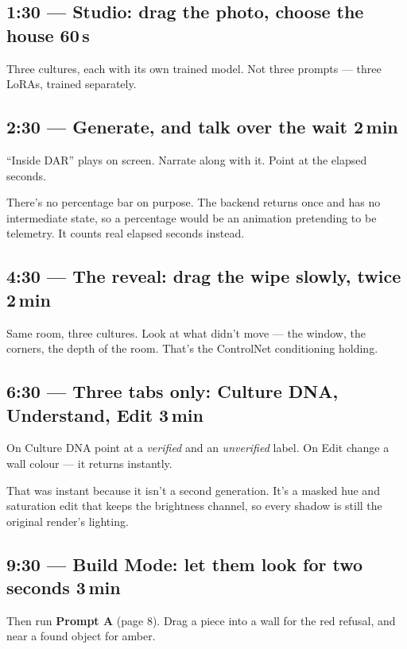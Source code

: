 \documentclass[10.5pt,a4paper]{article}
\begin{document}
\subsection*{1:30 --- Studio: drag the photo, choose the house \hfill \textnormal{\small 60\,s}}
\begin{sayit}
Three cultures, each with its own trained model. Not three prompts --- three LoRAs, trained separately.
\end{sayit}

\subsection*{2:30 --- Generate, and talk over the wait \hfill \textnormal{\small 2\,min}}
``Inside DAR'' plays on screen. Narrate along with it. Point at the elapsed seconds.
\begin{sayit}
There's no percentage bar on purpose. The backend returns once and has no intermediate state, so a
percentage would be an animation pretending to be telemetry. It counts real elapsed seconds instead.
\end{sayit}

\subsection*{4:30 --- The reveal: drag the wipe slowly, twice \hfill \textnormal{\small 2\,min}}
\begin{sayit}
Same room, three cultures. Look at what didn't move --- the window, the corners, the depth of the
room. That's the ControlNet conditioning holding.
\end{sayit}

\subsection*{6:30 --- Three tabs only: Culture DNA, Understand, Edit \hfill \textnormal{\small 3\,min}}
On Culture DNA point at a \emph{verified} and an \emph{unverified} label. On Edit change a wall
colour --- it returns instantly.
\begin{sayit}
That was instant because it isn't a second generation. It's a masked hue and saturation edit that
keeps the brightness channel, so every shadow is still the original render's lighting.
\end{sayit}

\subsection*{9:30 --- Build Mode: let them look for two seconds \hfill \textnormal{\small 3\,min}}
Then run \textbf{Prompt A} (page 8). Drag a piece into a wall for the red refusal, and near a found
object for amber.
\end{document}
